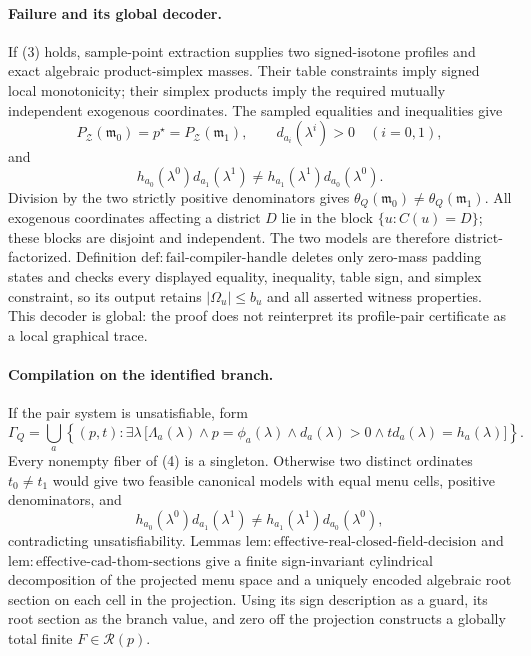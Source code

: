 \paragraph{Failure and its global decoder.}
If (3) holds, sample-point extraction supplies two signed-isotone profiles and exact algebraic product-simplex masses.  Their table constraints imply signed local monotonicity; their simplex products imply the required mutually independent exogenous coordinates.  The sampled equalities and inequalities give
\[
 P_{\mathcal Z}(\mathfrak m_0)=p^\star=P_{\mathcal Z}(\mathfrak m_1),
 \qquad
 d_{a_i}(\lambda^i)>0\quad(i=0,1),
\]
and
\[
 h_{a_0}(\lambda^0)d_{a_1}(\lambda^1)
 \ne h_{a_1}(\lambda^1)d_{a_0}(\lambda^0).
\]
Division by the two strictly positive denominators gives
\(
 \theta_Q(\mathfrak m_0)\ne\theta_Q(\mathfrak m_1)
\).
All exogenous coordinates affecting a district \(D\) lie in the block \(\{u:C(u)=D\}\); these blocks are disjoint and independent.  The two models are therefore district-factorized.  Definition \(\mathrm{def:fail\text{-}compiler\text{-}handle}\) deletes only zero-mass padding states and checks every displayed equality, inequality, table sign, and simplex constraint, so its output retains \(|\Omega_u|\le b_u\) and all asserted witness properties.  This decoder is global: the proof does not reinterpret its profile-pair certificate as a local graphical trace.

\paragraph{Compilation on the identified branch.}
If the pair system is unsatisfiable, form
\[
 \Gamma_Q
 =\bigcup_a\left\{(p,t):\exists\lambda\,
 \bigl[\Lambda_a(\lambda)\wedge p=\phi_a(\lambda)
 \wedge d_a(\lambda)>0
 \wedge t d_a(\lambda)=h_a(\lambda)\bigr]\right\}.
\tag{4}
\]
Every nonempty fiber of (4) is a singleton.  Otherwise two distinct ordinates \(t_0\ne t_1\) would give two feasible canonical models with equal menu cells, positive denominators, and
\[
 h_{a_0}(\lambda^0)d_{a_1}(\lambda^1)
 \ne h_{a_1}(\lambda^1)d_{a_0}(\lambda^0),
\]
contradicting unsatisfiability.  Lemmas \(\mathrm{lem:effective\text{-}real\text{-}closed\text{-}field\text{-}decision}\) and \(\mathrm{lem:effective\text{-}cad\text{-}thom\text{-}sections}\) give a finite sign-invariant cylindrical decomposition of the projected menu space and a uniquely encoded algebraic root section on each cell in the projection.  Using its sign description as a guard, its root section as the branch value, and zero off the projection constructs a globally total finite \(F\in\mathcal R(p)\).

